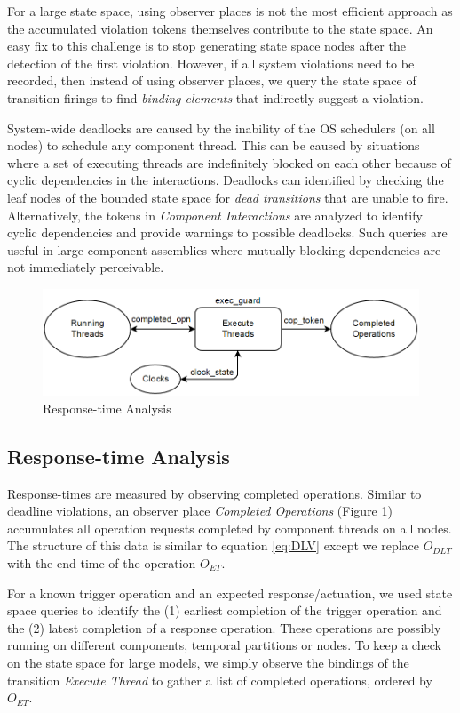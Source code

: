 For a large state space, using observer places is not the most efficient approach as the accumulated violation tokens themselves contribute to the state space. An easy fix to this challenge is to stop generating state space nodes after the detection of the first violation. However, if all system violations need to be recorded, then instead of using observer places, we query the state space of transition firings to find \emph{binding elements} that indirectly suggest a violation.

System-wide deadlocks are caused by the inability of the OS schedulers (on all nodes) to schedule any component thread. This can be caused by situations where a set of executing threads are indefinitely blocked on each other because of cyclic dependencies in the interactions. Deadlocks can identified by checking the leaf nodes of the bounded state space for \emph{dead transitions} that are unable to fire. Alternatively, the tokens in \emph{Component Interactions} are analyzed to identify cyclic dependencies and provide warnings to possible deadlocks. Such queries are useful in large component assemblies where mutually blocking dependencies are not immediately perceivable. 

\begin{figure}[htb]
	\centering
	\includegraphics[width=\textwidth]{./img/Response_Times.png}
	\caption{Response-time Analysis}
	\label{fig:COP}
\end{figure}

\subsection{Response-time Analysis}

Response-times are measured by observing completed operations. Similar to deadline violations, an observer place \emph{Completed Operations} (Figure \ref{fig:COP}) accumulates all operation requests completed by component threads on all nodes. The structure of this data is similar to equation \ref{eq:DLV} except we replace $O_{DLT}$ with the end-time of the operation $O_{ET}$.

For a known trigger operation and an expected response/actuation, we used state space queries to identify the (1) earliest completion of the trigger operation and the (2) latest completion of a response operation. These operations are possibly running on different components, temporal partitions or nodes. To keep a check on the state space for large models, we simply observe the bindings of the transition \emph{Execute Thread} to gather a list of completed operations, ordered by $O_{ET}$.

